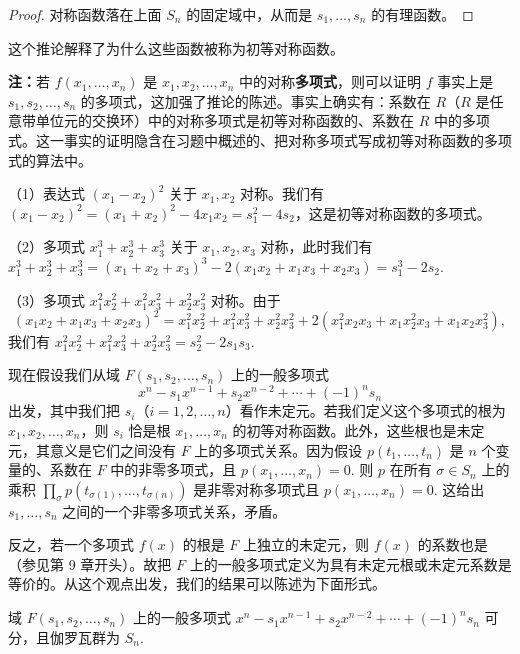 \begin{proof}
对称函数落在上面 \(S_n\) 的固定域中，从而是 \(s_1, \ldots, s_n\) 的有理函数。
\end{proof}

这个推论解释了为什么这些函数被称为初等对称函数。

\noindent\textbf{注：}若 \(f(x_1, \ldots, x_n)\) 是 \(x_1, x_2, \ldots, x_n\) 中的对称\textbf{多项式}，则可以证明 \(f\) 事实上是 \(s_1, s_2, \ldots, s_n\) 的多项式，这加强了推论的陈述。事实上确实有：系数在 \(R\)（\(R\) 是任意带单位元的交换环）中的对称多项式是初等对称函数的、系数在 \(R\) 中的多项式。这一事实的证明隐含在习题中概述的、把对称多项式写成初等对称函数的多项式的算法中。

\begin{example}
（1）表达式 \((x_1-x_2)^2\) 关于 \(x_1, x_2\) 对称。我们有 \((x_1-x_2)^2 = (x_1+x_2)^2-4x_1x_2 = s_1^2-4s_2\)，这是初等对称函数的多项式。

（2）多项式 \(x_1^3+x_2^3+x_3^3\) 关于 \(x_1, x_2, x_3\) 对称，此时我们有 \(x_1^3+x_2^3+x_3^3 = (x_1+x_2+x_3)^3-2(x_1x_2+x_1x_3+x_2x_3) = s_1^3-2s_2\).

（3）多项式 \(x_1^2x_2^2+x_1^2x_3^2+x_2^2x_3^2\) 对称。由于
\[
(x_1x_2+x_1x_3+x_2x_3)^2 = x_1^2x_2^2+x_1^2x_3^2+x_2^2x_3^2+2(x_1^2x_2x_3+x_1x_2^2x_3+x_1x_2x_3^2),
\]
我们有 \(x_1^2x_2^2+x_1^2x_3^2+x_2^2x_3^2 = s_2^2-2s_1s_3\).
\end{example}

现在假设我们从域 \(F(s_1, s_2, \ldots, s_n)\) 上的一般多项式
\[
x^n-s_1x^{n-1}+s_2x^{n-2}+\cdots+(-1)^ns_n
\]
出发，其中我们把 \(s_i\)（\(i = 1, 2, \ldots, n\)）看作未定元。若我们定义这个多项式的根为 \(x_1, x_2, \ldots, x_n\)，则 \(s_i\) 恰是根 \(x_1, \ldots, x_n\) 的初等对称函数。此外，这些根也是未定元，其意义是它们之间没有 \(F\) 上的多项式关系。因为假设 \(p(t_1, \ldots, t_n)\) 是 \(n\) 个变量的、系数在 \(F\) 中的非零多项式，且 \(p(x_1, \ldots, x_n) = 0\). 则 \(p\) 在所有 \(\sigma \in S_n\) 上的乘积 \(\prod_{\sigma}p(t_{\sigma(1)}, \ldots, t_{\sigma(n)})\) 是非零对称多项式且 \(p(x_1, \ldots, x_n) = 0\). 这给出 \(s_1, \ldots, s_n\) 之间的一个非零多项式关系，矛盾。

反之，若一个多项式 \(f(x)\) 的根是 \(F\) 上独立的未定元，则 \(f(x)\) 的系数也是（参见第 9 章开头）。故把 \(F\) 上的一般多项式定义为具有未定元根或未定元系数是等价的。从这个观点出发，我们的结果可以陈述为下面形式。

\begin{theorem}\label{thm:14.32}
域 \(F(s_1, s_2, \ldots, s_n)\) 上的一般多项式 \(x^n-s_1x^{n-1}+s_2x^{n-2}+\cdots+(-1)^ns_n\) 可分，且伽罗瓦群为 \(S_n\).
\end{theorem}

